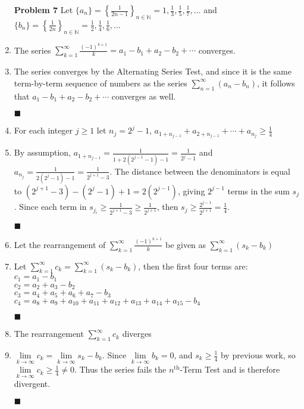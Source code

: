 \documentclass[a4paper,12pt]{report}
\newcommand{\bb}[1]{\mathbb{#1}}
\newcommand{\problem}[3]{
	\begin{enumerate}
		\item[\bf{Problem #1}] #2 
		#3
	\end{enumerate}
}
\newcommand{\subproof}[3]{
	\item[#1] #2
	\item[\bf{Proof:}] 
	#3 
	\begin{flushright}
		$\blacksquare$
	\end{flushright}
}
\begin{document}
\problem{7}{
	Let $\{a_n\} = \left\{\frac{1}{2n-1}\right\}_{n \in \bb{N}} = 1,\frac{1}{3},\frac{1}{5},\frac{1}{7},\ldots$ and $\{b_n\} = \left\{\frac{1}{2n}\right\}_{n \in \bb{N}} = \frac{1}{2},\frac{1}{4},\frac{1}{6},\ldots$
}{
	\subproof{(a)}{
		The series $\sum\limits_{k=1}^{\infty}\frac{(-1)^{k+1}}{k} = a_1 - b_1 + a_2 - b_2 + \cdots$ converges.
	}{
		The series converges by the Alternating Series Test, and since it is the same term-by-term sequence of numbers as the series $\sum\limits_{n=1}^{\infty}(a_n - b_n)$, it follows that $a_1 - b_1 + a_2 - b_2 + \cdots$ converges as well.
	}
	
	\subproof{(b)}{
		For each integer $j \geqslant 1$ let $n_j = 2^j - 1$, $a_{1+n_{j-1}} + a_{2+n_{j-1}} + \cdots + a_{n_{j}} \geqslant \frac{1}{4}$
	}{
		By assumption, $a_{1+n_{j-1}} = \frac{1}{1+2(2^{j-1}-1)-1} = \frac{1}{2^j-1}$ and $a_{n_{j}} = \frac{1}{2(2^{j}-1)-1} = \frac{1}{2^{j+1}-3}$. The distance between the denominators is equal to $(2^{j+1}-3)-(2^j-1) + 1 = 2(2^{j-1})$, giving $2^{j-1}$ terms in the sum $s_j$. Since each term in $s_{j_i} \geqslant \frac{1}{2^{j+1}-3} \geqslant \frac{1}{2^{j+1}}$, then $s_j \geqslant \frac{2^{j-1}}{2^{j+1}} = \frac{1}{4}$.
	}
	
	\subproof{(c)}{
		Let the rearrangement of $\sum\limits_{k=1}^{\infty}\frac{(-1)^{k+1}}{k}$ be given as $\sum\limits_{k=1}^{\infty}(s_k - b_k)$
	}{
		Let $\sum\limits_{k=1}^{\infty}c_k = \sum\limits_{k=1}^{\infty}(s_k - b_k)$, then the first four terms are:\\
		$c_1 = a_1 - b_1$ \\
		$c_2 = a_2 + a_3 - b_2$ \\
		$c_3 = a_4 + a_5 + a_6 + a_7 - b_3$ \\
		$c_4 = a_8 + a_9 + a_10 + a_11 + a_12 + a_13 + a_14 + a_15 - b_4$
	}
	
	\subproof{(d)}{
		The rearrangement $\sum\limits_{k=1}^{\infty}c_k$ diverges
	}{
		$\lim\limits_{k \to \infty}c_k = \lim\limits_{k \to \infty}s_k - b_k$. Since $\lim\limits_{k \to \infty}b_k = 0$, and $s_k \geqslant \frac{1}{4}$ by previous work, so $\lim\limits_{k \to \infty}c_k \geqslant \frac{1}{4} \neq 0$. Thus the series fails the $n^{\text{th}}$-Term Test and is therefore divergent.
	}
}
\end{document}
